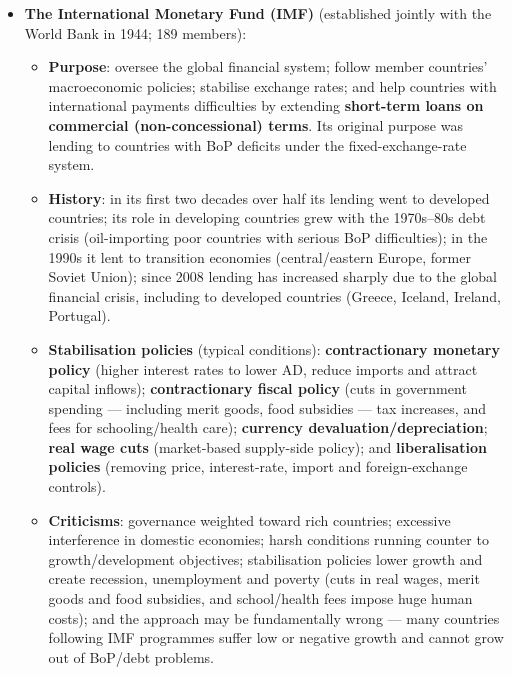 \begin{itemize}
\begin{itemize}
    \item \textbf{Criticisms}: early socially unsound projects (hydroelectric dams displacing indigenous people) and environmentally unsustainable projects; governance is weighted by financial contributions, giving rich countries far greater power; excessive interference in domestic policy; conditionality deprives countries of control over domestic economic activities; insufficient funds for poverty-oriented lending and for HIPC debt relief; the 2019 \textit{World Development Report} was criticised by the ILO for excessive focus on labour-market flexibility and for ignoring negative effects on workers; and it has been criticised for encouraging land grabs through privatisation and land takeovers that displace poor farmers.
  \end{itemize}
  \item \textbf{The International Monetary Fund (IMF)} (established jointly with the World Bank in 1944; 189 members):
  \begin{itemize}
    \item \textbf{Purpose}: oversee the global financial system; follow member countries' macroeconomic policies; stabilise exchange rates; and help countries with international payments difficulties by extending \textbf{short-term loans on commercial (non-concessional) terms}. Its original purpose was lending to countries with BoP deficits under the fixed-exchange-rate system.
    \item \textbf{History}: in its first two decades over half its lending went to developed countries; its role in developing countries grew with the 1970s--80s debt crisis (oil-importing poor countries with serious BoP difficulties); in the 1990s it lent to transition economies (central/eastern Europe, former Soviet Union); since 2008 lending has increased sharply due to the global financial crisis, including to developed countries (Greece, Iceland, Ireland, Portugal).
    \item \textbf{Stabilisation policies} (typical conditions): \textbf{contractionary monetary policy} (higher interest rates to lower AD, reduce imports and attract capital inflows); \textbf{contractionary fiscal policy} (cuts in government spending --- including merit goods, food subsidies --- tax increases, and fees for schooling/health care); \textbf{currency devaluation/depreciation}; \textbf{real wage cuts} (market-based supply-side policy); and \textbf{liberalisation policies} (removing price, interest-rate, import and foreign-exchange controls).
    \item \textbf{Criticisms}: governance weighted toward rich countries; excessive interference in domestic economies; harsh conditions running counter to growth/development objectives; stabilisation policies lower growth and create recession, unemployment and poverty (cuts in real wages, merit goods and food subsidies, and school/health fees impose huge human costs); and the approach may be fundamentally wrong --- many countries following IMF programmes suffer low or negative growth and cannot grow out of BoP/debt problems.

\end{itemize}
\end{itemize}
